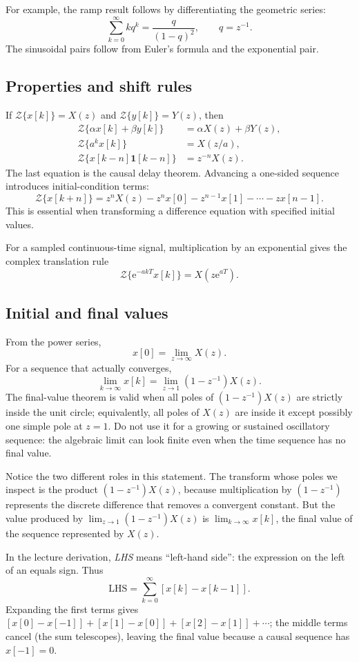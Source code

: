 \documentclass[11pt]{article}
\newcommand{\Z}{\mathcal{Z}}
\newcommand{\e}{\mathrm{e}}
\newcommand{\unitstep}{\mathbf{1}}
\begin{document}
For example, the ramp result follows by differentiating the geometric series:
\[
\sum_{k=0}^{\infty}kq^k=\frac{q}{(1-q)^2},\qquad q=z^{-1}.
\]
The sinusoidal pairs follow from Euler's formula and the exponential pair.

\subsection{Properties and shift rules}

If $\Z\{x[k]\}=X(z)$ and $\Z\{y[k]\}=Y(z)$, then
\begin{align*}
\Z\{\alpha x[k]+\beta y[k]\}&=\alpha X(z)+\beta Y(z),\\
\Z\{a^kx[k]\}&=X(z/a),\\
\Z\{x[k-n]\unitstep[k-n]\}&=z^{-n}X(z).
\end{align*}
The last equation is the causal delay theorem. Advancing a one-sided sequence introduces initial-condition terms:
\[
\Z\{x[k+n]\}=z^nX(z)-z^nx[0]-z^{n-1}x[1]-\cdots-zx[n-1].
\]
This is essential when transforming a difference equation with specified initial values.

For a sampled continuous-time signal, multiplication by an exponential gives the complex translation rule
\[
\Z\{\e^{-akT}x[k]\}=X(z\e^{aT}).
\]

\subsection{Initial and final values}

From the power series,
\[
x[0]=\lim_{z\to\infty}X(z).
\]
For a sequence that actually converges,
\[
\lim_{k\to\infty}x[k]=\lim_{z\to 1}(1-z^{-1})X(z).
\]
The final-value theorem is valid when all poles of $(1-z^{-1})X(z)$ are strictly inside the unit circle; equivalently, all poles of $X(z)$ are inside it except possibly one simple pole at $z=1$. Do not use it for a growing or sustained oscillatory sequence: the algebraic limit can look finite even when the time sequence has no final value.

Notice the two different roles in this statement. The transform whose poles we inspect is the product $(1-z^{-1})X(z)$, because multiplication by $(1-z^{-1})$ represents the discrete difference that removes a convergent constant. But the value produced by
$\lim_{z\to1}(1-z^{-1})X(z)$ is $\lim_{k\to\infty}x[k]$, the final value of the sequence represented by $X(z)$.

In the lecture derivation, \emph{LHS} means ``left-hand side'': the expression on the left of an equals sign. Thus
\[
\mathrm{LHS}=\sum_{k=0}^{\infty}[x[k]-x[k-1]].
\]
Expanding the first terms gives $[x[0]-x[-1]]+[x[1]-x[0]]+[x[2]-x[1]]+\cdots$; the middle terms cancel (the sum telescopes), leaving the final value because a causal sequence has $x[-1]=0$.
\end{document}
